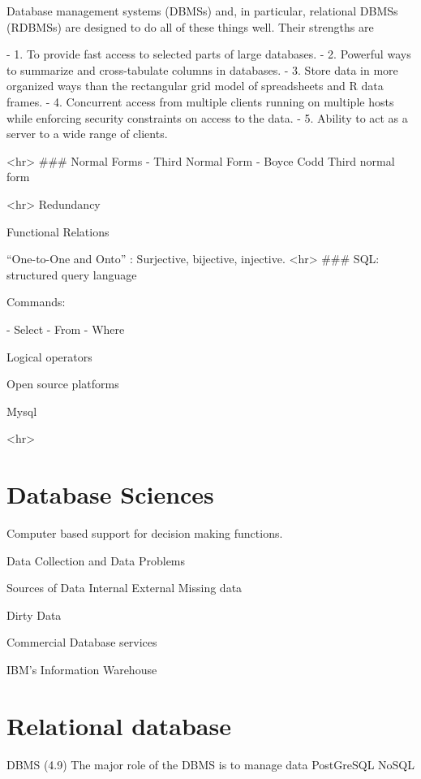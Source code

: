 Database management systems (DBMSs) and, in particular, relational DBMSs (RDBMSs)
are designed to do all of these things well. Their strengths are

- 1. To provide fast access to selected parts of large databases.
- 2. Powerful ways to summarize and cross-tabulate columns in databases.
- 3. Store data in more organized ways than the rectangular grid model of spreadsheets and R
data frames.
- 4. Concurrent access from multiple clients running on multiple hosts while enforcing security
constraints on access to the data.
- 5. Ability to act as a server to a wide range of clients.

<hr>
###  Normal Forms
- Third Normal Form
- Boyce Codd Third normal form

<hr>
Redundancy

Functional Relations

“One-to-One and Onto” : Surjective, bijective, injective.
<hr>
### SQL: structured query language

Commands:

-	Select
-	From 
-	Where

Logical operators

Open source platforms

Mysql

<hr>
\newpage
\section{Database Sciences}
 

Computer based support for decision making functions.
 
 
Data Collection and Data Problems
 
 
Sources of Data
            Internal
            External
Missing data
 
Dirty Data
 
 
Commercial Database services
 
IBM’s Information Warehouse
 
\section{Relational database}
 
DBMS (4.9)
The major role of the DBMS is to manage data
PostGreSQL
NoSQL
